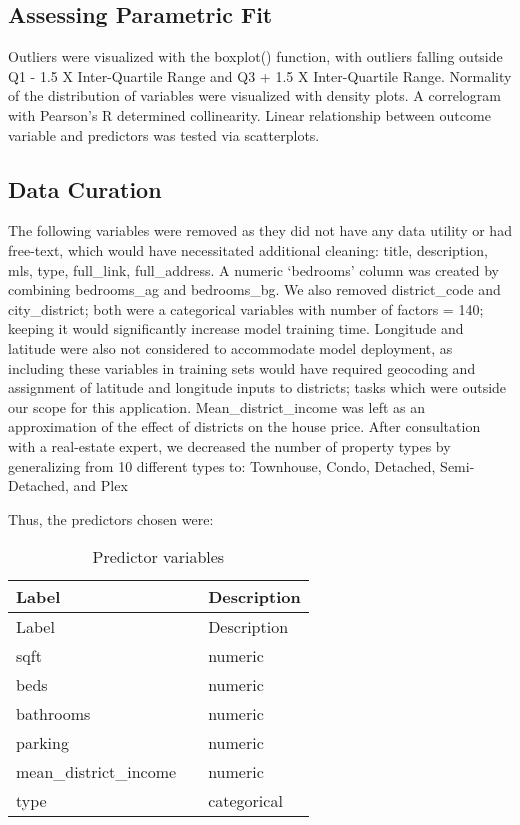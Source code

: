 \documentclass[11pt,]{article}
\begin{document}
\hypertarget{assessing-parametric-fit}{%
\subsection{Assessing Parametric Fit}\label{assessing-parametric-fit}}

Outliers were visualized with the boxplot() function, with outliers
falling outside Q1 - 1.5 X Inter-Quartile Range and Q3 + 1.5 X
Inter-Quartile Range. Normality of the distribution of variables were
visualized with density plots. A correlogram with Pearson's R determined
collinearity. Linear relationship between outcome variable and
predictors was tested via scatterplots.

\hypertarget{data-curation}{%
\subsection{Data Curation}\label{data-curation}}

The following variables were removed as they did not have any data
utility or had free-text, which would have necessitated additional
cleaning: title, description, mls, type, full\_link, full\_address. A
numeric `bedrooms' column was created by combining bedrooms\_ag and
bedrooms\_bg. We also removed district\_code and city\_district; both
were a categorical variables with number of factors = 140; keeping it
would significantly increase model training time. Longitude and latitude
were also not considered to accommodate model deployment, as including
these variables in training sets would have required geocoding and
assignment of latitude and longitude inputs to districts; tasks which
were outside our scope for this application. Mean\_district\_income was
left as an approximation of the effect of districts on the house price.
After consultation with a real-estate expert, we decreased the number of
property types by generalizing from 10 different types to: Townhouse,
Condo, Detached, Semi-Detached, and Plex

Thus, the predictors chosen were:

\begin{longtable}[]{@{}lll@{}}
\caption{Predictor variables}\tabularnewline
\toprule
Label & & Description\tabularnewline
\midrule
\endfirsthead
\toprule
Label & & Description\tabularnewline
\midrule
\endhead
sqft & & numeric\tabularnewline
beds & & numeric\tabularnewline
bathrooms & & numeric\tabularnewline
parking & & numeric\tabularnewline
mean\_district\_income & & numeric\tabularnewline
type & & categorical\tabularnewline
\bottomrule
\end{longtable}
\end{document}
